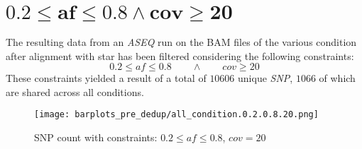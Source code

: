 \documentclass{article}
\begin{document}
\section*{$\mathbf{0.2\le af\le 0.8\land cov\ge 20}$}
The resulting data from an \emph{ASEQ} run on the BAM files of the various condition after alignment with star has been filtered considering the following constraints:
  $$0.2\le af\le 0.8\qquad\land\qquad cov\ge 20$$
	These constraints yielded a result of a total of $10606$ unique \emph{SNP}, $1066$ of which are shared across all conditions.
\begin{figure}[H]
  \texttt{[image: barplots\_pre\_dedup/all\_condition.0.2.0.8.20.png]}
\caption{SNP count with constraints: $0.2\le af \le 0.8$, $cov = 20$ }
\end{figure}

\end{document}
